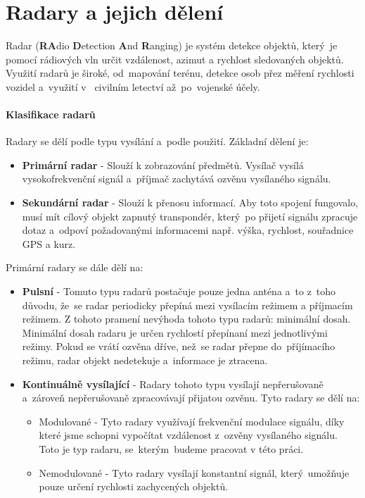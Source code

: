 	\section{Radary a jejich dělení}\label{uvod::radary}
		Radar (\textbf{RA}dio \textbf{D}etection \textbf{A}nd \textbf{R}anging) je systém detekce objektů, který~je pomocí rádiových vln určit vzdálenost, azimut a rychlost sledovaných objektů. Využití radarů je široké, od~mapování terénu, detekce osob přez měření rychlosti vozidel a~využití v ~civilním letectví až~po~vojenské účely.	
			
	\paragraph{Klasifikace radarů}
			Radary se dělí podle typu vysílání a~podle použití\cite{radarClasification}. Základní dělení je: 
			\begin{itemize}
				\item \textbf{Primární radar}	-	Slouží k zobrazování předmětů. Vysílač vysílá vysokofrekvenční signál a~příjmač zachytává ozvěnu vysílaného signálu.
					
				\item \textbf{Sekundární radar}	-	Slouží k přenosu informací. Aby toto spojení fungovalo, musí mít cílový objekt zapnutý transpondér, který~po přijetí signálu zpracuje dotaz a~odpoví požadovanými informacemi např. výška, rychlost, souřadnice GPS a kurz. 
			\end{itemize}
			
			Primární radary se dále dělí na:
			\begin{itemize}
				\item \textbf{Pulsní}	-	Tomuto typu radarů postačuje pouze jedna anténa a~to z~toho důvodu, že~se radar periodicky přepíná mezi vysílacím režimem a příjmacím režimem. Z tohoto pramení nevýhoda tohoto typu radarů: minimální dosah. Minimální dosah radaru je určen rychlostí přepínaní mezi jednotlivými režimy. Pokud se vrátí ozvěna dříve, než~se radar přepne do~příjímacího režimu, radar objekt nedetekuje a~informace je ztracena.
				
				\item \textbf{Kontinuálně vysílající}	-	Radary tohoto typu vysílají nepřerušovaně a~zároveň nepřerušovaně zpracovávají přijatou ozvěnu. Tyto radary se dělí na:
					\begin{itemize}
						\item Modulované - Tyto radary využívají frekvenční modulace signálu, díky které jsme schopni vypočítat vzdálenost z~ozvěny vysílaného signálu. Toto je typ radaru, se~kterým~budeme pracovat v této práci.
						
						\item Nemodulované - Tyto radary vysílají konstantní signál, který~umožňuje pouze určení rychlosti zachycených objektů.
					\end{itemize}
			\end{itemize}
		
